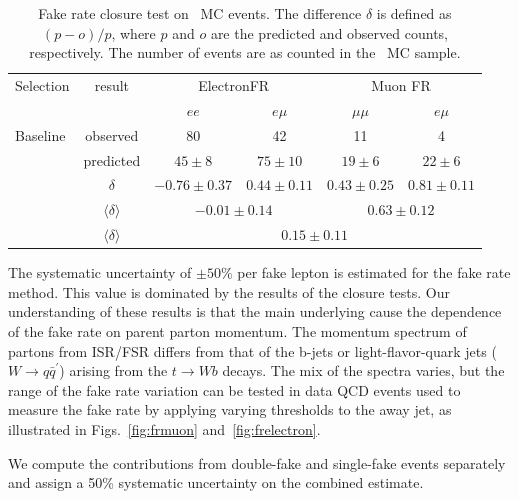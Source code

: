\begin{table}[h]
\begin{center}
\begin{tabular}{lc|cc|cc}
\hline\hline
Selection	& result	&	\multicolumn{2}{|c}{ElectronFR}		& \multicolumn{2}{|c}{Muon FR}	\\
		&				&	$ee$		& $e\mu$		& $\mu\mu$	& $e\mu$	\\\hline
Baseline	&	observed		& 80			& 42			& 11		& 4		\\
		&predicted			& $45\pm8$		& $75\pm10$		& $19\pm 6$	& $22\pm6$	\\ 
		& $\delta$			& $-0.76\pm 0.37$	& $0.44\pm0.11$		& $0.43\pm0.25$	& $0.81\pm0.11$	\\ 
		& $\langle \delta \rangle$	& \multicolumn{2}{|c}{$-0.01\pm0.14$}		& \multicolumn{2}{|c}{$0.63\pm0.12$} \\
		& $\langle \delta \rangle$	& 		\multicolumn{4}{|c}{$0.15\pm 0.11$}				\\ \hline
\hline
\end{tabular}
\caption{\label{tab:ttclosure}Fake rate closure test on \ttbar\ MC events.
The difference $\delta$ is defined as $(p-o)/p$, where $p$ and $o$ are the predicted
and observed counts, respectively.
The number of events are as counted in the \ttbar\ MC sample.}
\end{center}
\end{table}

\newcommand{\nNoNu}{\ensuremath{N_{{n}\overline{n}}}}
\newcommand{\nNoNo}{\ensuremath{N_{\overline{n}\overline{n}}}}
\newcommand{\nNuNu}{\ensuremath{N_{{n}{n}}}}

The systematic uncertainty of $\pm 50\%$ per fake lepton is estimated for the fake rate method.
This value is dominated by the results of the closure tests.
Our understanding of these results is that the main underlying cause 
the dependence of the fake rate on parent parton momentum.
The momentum spectrum of partons from ISR/FSR differs from that of the b-jets
or light-flavor-quark jets ($W\to q\bar{q}^\prime$) arising from the $t\to W b$ decays.
The mix of the spectra varies, but the range of the fake rate variation
can be tested in data QCD events used to measure the fake rate
by applying varying thresholds to the away jet, as illustrated in Figs.~\ref{fig:frmuon} and~\ref{fig:frelectron}.

We compute the contributions from double-fake and single-fake events separately and assign a 50\% systematic
uncertainty on the combined estimate.

